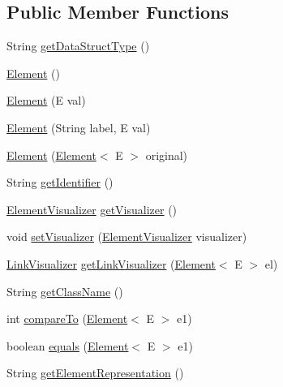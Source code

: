\subsection*{Public Member Functions}
\begin{DoxyCompactItemize}
\item 
String \hyperlink{classbridges_1_1base_1_1_element_a6a1b70fa4b1936d10c6deb433acf8cd9}{get\+Data\+Struct\+Type} ()
\item 
\hyperlink{classbridges_1_1base_1_1_element_aa5fc5728f2ed4b041118a77409442390}{Element} ()
\item 
\hyperlink{classbridges_1_1base_1_1_element_a6cb9b3b85b923602aad5c1be6696d825}{Element} (E val)
\item 
\hyperlink{classbridges_1_1base_1_1_element_a14e857e8050eac518900a458f0364d8e}{Element} (String label, E val)
\item 
\hyperlink{classbridges_1_1base_1_1_element_a91db9de70b65a1d7b5f27c1c0b909832}{Element} (\hyperlink{classbridges_1_1base_1_1_element}{Element}$<$ E $>$ original)
\item 
String \hyperlink{classbridges_1_1base_1_1_element_ad5496f568b4cca3909800eceea5fb47d}{get\+Identifier} ()
\item 
\hyperlink{classbridges_1_1base_1_1_element_visualizer}{Element\+Visualizer} \hyperlink{classbridges_1_1base_1_1_element_a42c84d41dfb7bd05a586e303cb33de72}{get\+Visualizer} ()
\item 
void \hyperlink{classbridges_1_1base_1_1_element_a5befa95788099f1bc72cdf5361c55bed}{set\+Visualizer} (\hyperlink{classbridges_1_1base_1_1_element_visualizer}{Element\+Visualizer} visualizer)
\item 
\hyperlink{classbridges_1_1base_1_1_link_visualizer}{Link\+Visualizer} \hyperlink{classbridges_1_1base_1_1_element_a7978552c7b36e28c302f611fc1958e7f}{get\+Link\+Visualizer} (\hyperlink{classbridges_1_1base_1_1_element}{Element}$<$ E $>$ el)
\item 
String \hyperlink{classbridges_1_1base_1_1_element_aa235244426486921bef319a28616bf8b}{get\+Class\+Name} ()
\item 
int \hyperlink{classbridges_1_1base_1_1_element_a6cd4c4f15c6a4f87f59e443cffe87a20}{compare\+To} (\hyperlink{classbridges_1_1base_1_1_element}{Element}$<$ E $>$ e1)
\item 
boolean \hyperlink{classbridges_1_1base_1_1_element_aff10d60700eb1aceca5c0b519bdccccb}{equals} (\hyperlink{classbridges_1_1base_1_1_element}{Element}$<$ E $>$ e1)
\item 
String \hyperlink{classbridges_1_1base_1_1_element_a8822450cfaf8495bc955d777ad35ea3f}{get\+Element\+Representation} ()

\end{DoxyCompactItemize}
